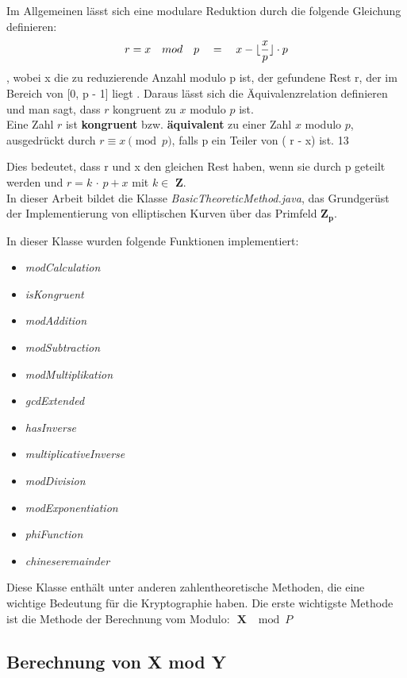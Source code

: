 Im Allgemeinen lässt sich eine modulare Reduktion durch die folgende Gleichung definieren: \[ r = x \quad mod \quad p \quad = \quad x - \lfloor\frac{x}{p}\rfloor \cdot p \], wobei x die zu reduzierende Anzahl modulo p ist, der gefundene Rest r, der im Bereich von [0, p - 1] liegt \cite{patent}. Daraus lässt sich die Äquivalenzrelation definieren und man sagt, dass $ r $ kongruent zu $ x $ modulo $ p $ ist.\\

Eine Zahl $ r $ ist \textbf{kongruent} bzw. \textbf{äquivalent} zu einer Zahl $ x $ modulo $ p $, ausgedrückt durch \( r \equiv x \pmod{p} \), falls p ein Teiler von ( r - x) ist. 
13


Dies bedeutet, dass r und x den gleichen Rest haben, wenn sie durch p geteilt werden und $ r = k $ $\cdot $ $ p + x $ mit  $ k \in $ $ \mathbf{Z} $.\\



In dieser Arbeit bildet  die Klasse \textit{BasicTheoreticMethod.java}, das Grundgerüst der
Implementierung von elliptischen Kurven über das Primfeld $\mathbf{
Z_p} $. 

In dieser Klasse wurden folgende Funktionen implementiert:
\begin{itemize}
    \item \textit{modCalculation} 
    \item \textit{isKongruent}
    \item \textit{modAddition}
    \item \textit{modSubtraction}
    \item \textit{modMultiplikation}
    \item \textit{gcdExtended}
    \item \textit{hasInverse}
    \item \textit{multiplicativeInverse}
    \item \textit{modDivision}
    \item \textit{modExponentiation}
    \item \textit{phiFunction}
    \item \textit{chineseremainder}
\end{itemize}

Diese Klasse enthält unter anderen zahlentheoretische Methoden, die eine wichtige Bedeutung für die Kryptographie haben.
Die erste wichtigste Methode ist die Methode der Berechnung vom Modulo: $\textbf{ X $\mod P $} $

\subsection{Berechnung von X mod Y}


